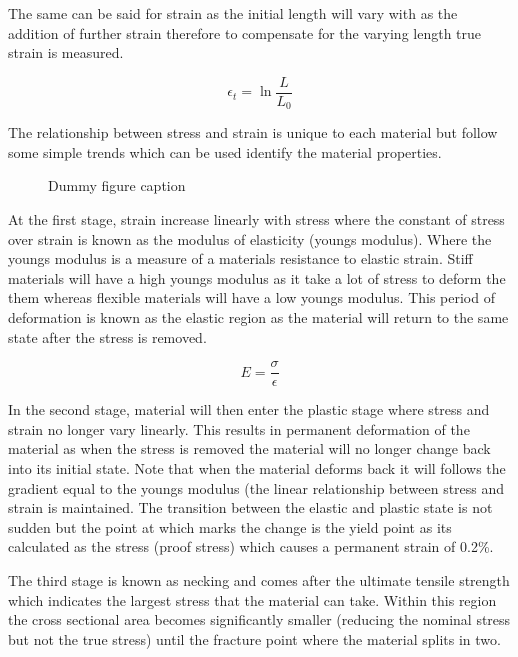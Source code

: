 \documentclass[a4paper,10pt]{article}
\begin{document}
The same can be said for strain as the initial length will vary with as the addition of further strain therefore to compensate for the varying length true strain is measured.

\begin{equation}
 \label{True Strain}
 \epsilon_t = \ln{\frac{L}{L_0}}
\end{equation}

The relationship between stress and strain is unique to each material but follow some simple trends which can be used identify the material properties.

\begin{figure}[h]
  \caption{Dummy figure caption}
  \label{fig:dummy 1}
\end{figure}

At the first stage, strain increase linearly with stress where the constant of stress over strain is known as the modulus of elasticity (youngs modulus). Where the youngs modulus is a measure of a materials resistance to elastic strain. Stiff materials will have a high youngs modulus as it take a lot of stress to deform the them whereas flexible materials will have a low youngs modulus. This period of deformation is known as the elastic region as the material will return to the same state after the stress is removed.

\begin{equation}
 \label{Youngs Modulus}
 E = \frac{\sigma}{\epsilon}
\end{equation}

In the second stage, material will then enter the plastic stage where stress and strain no longer vary linearly. This results in permanent deformation of the material as when the stress is removed the material will no longer change back into its initial state. Note that when the material deforms back it will follows the gradient equal to the youngs modulus (the linear relationship between stress and strain is maintained. The transition between the elastic and plastic state is not sudden but the point at which marks the change is the yield point as its calculated as the stress (proof stress) which causes a permanent strain of 0.2\%. \par

The third stage is known as necking and comes after the ultimate tensile strength which indicates the largest stress that the material can take. Within this region the cross sectional area becomes significantly smaller (reducing the nominal stress but not the true stress) until the fracture point where the material splits in two.\newline
\end{document}
